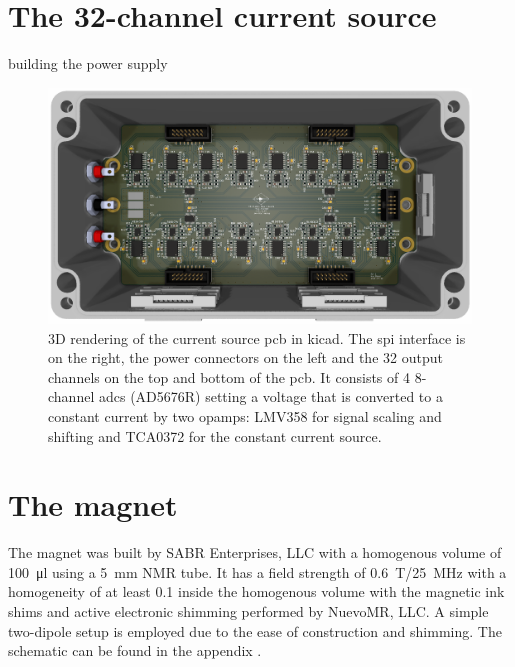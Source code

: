 \section{The 32-channel current source}
building the power supply
\begin{figure}[hbt]
    \centering
    \includegraphics{images/32-channel_current_source.png}
    \caption{ 3D rendering of the current source \acrshort{pcb} in \gls{kicad}. The \acrshort{spi} interface is on the right, the power connectors on the left and the 32 output channels on the top and bottom of the \acrshort{pcb}. It consists of 4 8-channel \acrshort{adc}s (AD5676R) setting a voltage that is converted to a constant current by two \acrshort{opamp}s: LMV358 for signal scaling and shifting and TCA0372 for the constant current source.}
\end{figure}

\section{The magnet}
The magnet was built by SABR Enterprises, LLC with a homogenous volume of \qty{100}{\micro\litre} using a \qty{5}{\milli\metre} NMR tube. It has a field strength of \qty{0.6}{\tesla}/\qty{25}{\mega\hertz} with a homogeneity of at least \qty{0.1}{\partspermillion} inside the homogenous volume with the magnetic ink shims and active electronic shimming performed by NuevoMR, LLC. A simple two-dipole setup is employed due to the ease of construction and shimming. The schematic can be found in the appendix .

